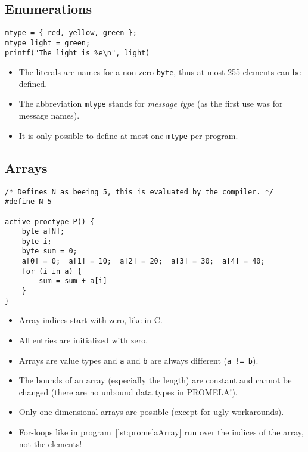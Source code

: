\documentclass[a4paper, 11pt, accentcolor = tud3b]{tudreport}
\newcommand{\inlinePromela}[1]{\lstinline[language = PROMELA]|#1|}
\begin{document}
			\subsection{Enumerations}
				\begin{lstlisting}[caption = { PROMELA Enumerations }, label = lst:promelaEnum, language = PROMELA]
mtype = { red, yellow, green };
mtype light = green;
printf("The light is %e\n", light)
				\end{lstlisting}
				
				\begin{itemize}
					\item The literals are names for a non-zero \inlinePromela{byte}, thus at most 255 elements can be defined.
					\item The abbreviation \inlinePromela{mtype} stands for \textit{message type} (as the first use was for message names).
					\item It is only possible to define at most one \inlinePromela{mtype} per program.
				\end{itemize}

			\subsection{Arrays}
				\begin{lstlisting}[caption = { PROMELA Arrays }, label = lst:promelaArray, language = PROMELA]
/* Defines N as beeing 5, this is evaluated by the compiler. */
#define N 5

active proctype P() {
	byte a[N];
	byte i;
	byte sum = 0;
	a[0] = 0;  a[1] = 10;  a[2] = 20;  a[3] = 30;  a[4] = 40;
	for (i in a) {
		sum = sum + a[i]
	}
}
				\end{lstlisting}
			
				\begin{itemize}
					\item Array indices start with zero, like in C.
					\item All entries are initialized with zero.
					\item Arrays are value types and \inlinePromela{a} and \inlinePromela{b} are always different (\inlinePromela{a != b}).
					\item The bounds of an array (especially the length) are constant and cannot be changed (there are no unbound data types in PROMELA!).
					\item Only one-dimensional arrays are possible (except for ugly workarounds).
					\item For-loops like in program~\ref{lst:promelaArray} run over the indices of the array, not the elements!
				\end{itemize}
\end{document}
